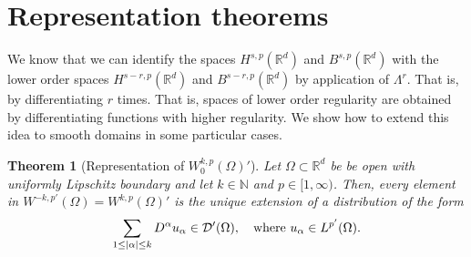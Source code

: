 \documentclass[
    a4paper,
    DIV=14,
    abstract=true,
    numbers=noenddot
]
{scrartcl}
\newtheorem{theorem}{Theorem}[section]
\theoremstyle{definition}
\newcommand{\N}{\mathbb{N}}
\newcommand{\R}{\mathbb{R}}
\newcommand{\Dd}{\mathcal{D}}
\begin{document}
\section{Representation theorems}
We know that we can identify the spaces $H^{s,p}(\R^d )$ and $B^{s,p}(\R^d )$ with the lower order spaces $H^{s-r,p}(\R^d )$ and $B^{s-r,p}(\R^d )$ by application of $\Lambda ^r$. That is, by differentiating $r$ times. That is, spaces of lower order regularity are obtained by differentiating functions with higher regularity. We show how to extend this idea to smooth domains in some particular cases.

\begin{theorem}[Representation of $W_0^{k,p}(\Omega )'$]\label{riesz representation}
    Let $\Omega \subset \R^d$ be be open with uniformly Lipschitz boundary and let  $k \in \N$ and $p \in [1,\infty)$. Then, every element in $W^{-k,p'}(\Omega )=W^{k,p}(\Omega )'$ is the unique extension of a distribution  of the form
    \begin{align*}
        \sum_{1\leq\abs{\alpha}\leq k} D^\alpha u_\alpha\in \Dd'(\Omega ),\quad \text{where }    u_\alpha \in L^{p'}(\Omega ).
    \end{align*}

\end{theorem}
\end{document}
